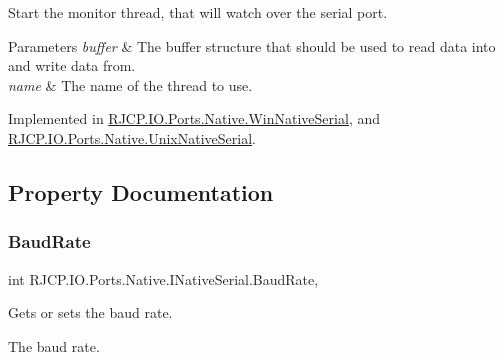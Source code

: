 Start the monitor thread, that will watch over the serial port. 


\begin{DoxyParams}{Parameters}
{\em buffer} & The buffer structure that should be used to read data into and write data from.\\
\hline
{\em name} & The name of the thread to use.\\
\hline
\end{DoxyParams}


Implemented in \mbox{\hyperlink{class_r_j_c_p_1_1_i_o_1_1_ports_1_1_native_1_1_win_native_serial_af8513c10fdf373932ec07a2bb033d0c4}{R\+J\+C\+P.\+I\+O.\+Ports.\+Native.\+Win\+Native\+Serial}}, and \mbox{\hyperlink{class_r_j_c_p_1_1_i_o_1_1_ports_1_1_native_1_1_unix_native_serial_a1dff48491b2421e1310acdab46d80fbb}{R\+J\+C\+P.\+I\+O.\+Ports.\+Native.\+Unix\+Native\+Serial}}.



\subsection{Property Documentation}
\mbox{\label{interface_r_j_c_p_1_1_i_o_1_1_ports_1_1_native_1_1_i_native_serial_a527ba2dd350ff44e1ecb838b3041b11d}} 
\subsubsection{\texorpdfstring{BaudRate}{BaudRate}}
{\footnotesize\ttfamily int R\+J\+C\+P.\+I\+O.\+Ports.\+Native.\+I\+Native\+Serial.\+Baud\+Rate\hspace{0.3cm}{\ttfamily [get]}, {\ttfamily [set]}}



Gets or sets the baud rate. 

The baud rate. \mbox{\label{interface_r_j_c_p_1_1_i_o_1_1_ports_1_1_native_1_1_i_native_serial_aaf396718eeffc0fd76480f986f9613d9}} 
